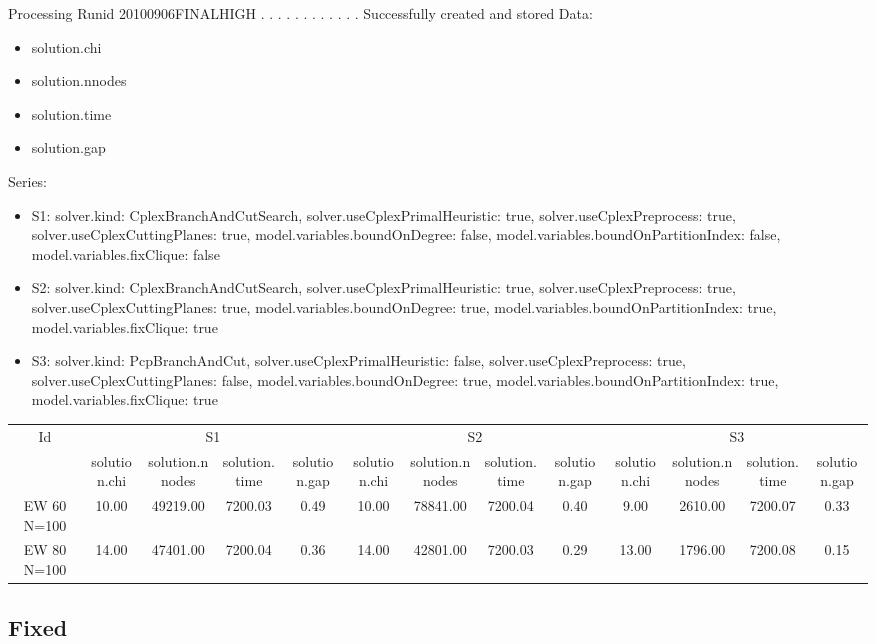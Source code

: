 \documentclass[landscape, 12pt]{report}
\begin{document}
 
Processing Runid 20100906FINALHIGH
. . . . . . . . . . . .  Successfully created and stored
Data:
\begin{itemize}
\item solution.chi
\item solution.nnodes
\item solution.time
\item solution.gap
\end{itemize}
Series:
\begin{itemize}
\item S1: solver.kind: CplexBranchAndCutSearch, solver.useCplexPrimalHeuristic: true, solver.useCplexPreprocess: true, solver.useCplexCuttingPlanes: true, model.variables.boundOnDegree: false, model.variables.boundOnPartitionIndex: false, model.variables.fixClique: false
\item S2: solver.kind: CplexBranchAndCutSearch, solver.useCplexPrimalHeuristic: true, solver.useCplexPreprocess: true, solver.useCplexCuttingPlanes: true, model.variables.boundOnDegree: true, model.variables.boundOnPartitionIndex: true, model.variables.fixClique: true
\item S3: solver.kind: PcpBranchAndCut, solver.useCplexPrimalHeuristic: false, solver.useCplexPreprocess: true, solver.useCplexCuttingPlanes: false, model.variables.boundOnDegree: true, model.variables.boundOnPartitionIndex: true, model.variables.fixClique: true
\end{itemize}
\begin{tabular}{|c|cccc|cccc|cccc|}
\hline
\multicolumn{1}{|c|}{Id} & \multicolumn{4}{|c|}{S1} & \multicolumn{4}{|c|}{S2} & \multicolumn{4}{|c|}{S3}
\\
 & solution.chi & solution.nnodes & solution.time & solution.gap & solution.chi & solution.nnodes & solution.time & solution.gap & solution.chi & solution.nnodes & solution.time & solution.gap
\\
\hline
EW 60 N=100 & 10.00 & 49219.00 & 7200.03 & 0.49 & 10.00 & 78841.00 & 7200.04 & 0.40 & 9.00 & 2610.00 & 7200.07 & 0.33
\\
EW 80 N=100 & 14.00 & 47401.00 & 7200.04 & 0.36 & 14.00 & 42801.00 & 7200.03 & 0.29 & 13.00 & 1796.00 & 7200.08 & 0.15
\\
\hline 
 \end{tabular}

\clearpage
	
		\subsection{Fixed}
	
\end{document}
